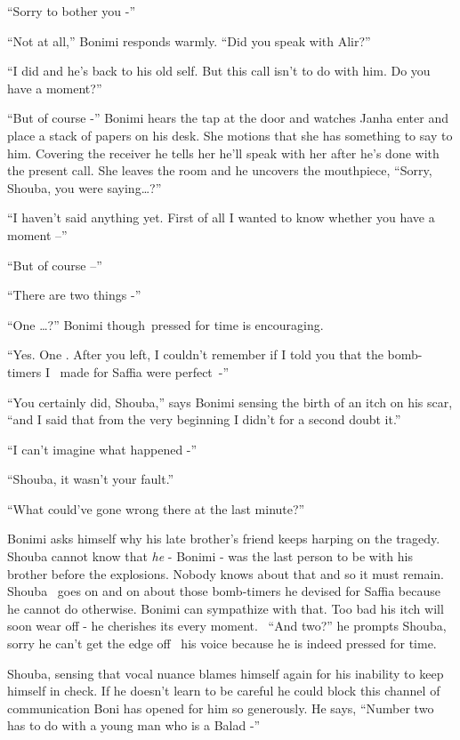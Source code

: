 \documentclass[twoside,11pt]{book}
\begin{document}
``Sorry to bother you -''

``Not at all,'' Bonimi responds warmly. ``Did you speak with Alir?''

``I did and he's back to his old self. But this call isn't to do with him. Do you have a
moment?''

``But of course -'' Bonimi hears the tap at the door and watches Janha enter and place a stack
of papers on his desk. She motions that she has something to say to him. Covering the receiver he tells her he'll speak
with her after he's done with the present call. She leaves the room and he uncovers the mouthpiece,
``Sorry, Shouba, you were saying{\dots}?''

``I haven't said anything yet. First of all I wanted to know whether you have a moment --''

``But of course --''

``There are two things -''

``One {\dots}?'' Bonimi though~pressed for time is encouraging.

``Yes. One . After you left, I couldn't remember if I told you that the bomb-timers I \ made for Saffia
were perfect~-''

``You certainly did, Shouba,'' says Bonimi sensing the birth of an itch on his scar,
``and I said that from the very beginning I didn't for a second doubt it.''

``I can't imagine what happened -''

``Shouba, it wasn't your fault.''

``What could've gone wrong there at the last minute?''

Bonimi asks himself why his late brother's friend keeps harping on the tragedy. Shouba cannot know that \textit{he} -
Bonimi - was the last person to be with his brother before the explosions. Nobody knows about that and so it must
remain. Shouba~ goes on and on about those bomb-timers he devised for Saffia because he cannot do otherwise. Bonimi can
sympathize with that. Too bad his itch will soon wear off - he cherishes its every moment. ~``And
two?'' he prompts Shouba, sorry he can't get the edge off \ his voice because he is indeed pressed for
time.

Shouba, sensing that vocal nuance blames himself again for his inability to keep himself in check. If he doesn't learn
to be careful he could block this channel of communication Boni has opened for him so generously. He says,
``Number two has to do with a young man who is a Balad -''
\end{document}
